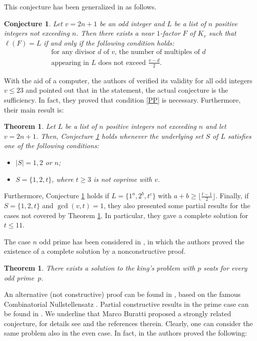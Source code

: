 \documentclass{amsart}
\newtheorem{thm}[defi]{Theorem}
\newtheorem{conj}{Conjecture}
\theoremstyle{definition}
\numberwithin{equation}{section}
\begin{document}
This conjecture has been generalized  in \cite{PP} as follows.
\begin{conj}\label{MPP}
Let $v=2n+1$ be an odd integer and  $L$ be a list of $n$ positive integers not
exceeding $n$.
Then there exists a near $1$-factor $F$ of $K_v$ such that $\ell(F)=L$ if and only if the following condition holds:
\begin{equation}\label{PP}
\left. \begin{array}{c}
\textrm{for any divisor $d$ of $v$, the number of multiples of $d$} \\
\textrm{appearing in $L$ does not exceed $\frac{v-d}{2}$.}
\end{array}\right.
\end{equation}
\end{conj}
With the aid of a computer, the authors of \cite{PP} verified its validity for all odd integers $v\leq 23$ and
pointed out that in the statement, the actual conjecture is the sufficiency. In
fact, they proved that condition \eqref{PP} is necessary. Furthermore, their main result is:

\begin{thm} \label{thm:MPP}
Let $L$ be a list of $n$ positive integers not exceeding $n$ and let $v = 2n + 1$.
Then, Conjecture \ref{MPP} holds whenever the underlying set $S$ of $L$ satisfies one of the following
conditions:
\begin{itemize}
\item[(1)] $|S|=1, 2$ or $n$;
\item[(2)] $S=\{1, 2, t\}$, where $t \geq 3$ is not coprime with $v$.
\end{itemize}
\end{thm}
Furthermore, Conjecture \ref{MPP} holds if $L=\{1^a, 2^b, t^c\}$ with $a + b \geq \lfloor\frac{t-1}{2}\rfloor$.
Finally, if $S=\{1, 2, t\}$ and $\gcd(v, t)= 1$, they also presented some partial results for the cases
not covered by Theorem \ref{thm:MPP}. In particular, they gave a complete solution for $t \leq 11$.


The case $n$ odd prime has been considered in \cite{PM}, in which the authors proved the existence of
a complete solution by a nonconstructive proof.

\begin{thm}
There exists a solution to the king's problem with $p$ seats for every odd prime~$p$.
\end{thm}

An alternative (not constructive) proof can be found in \cite{KP}, based on the famous Combinatorial Nullstellensatz \cite{A}.
Partial constructive results in the prime case can be found in \cite{R}.
We underline that Marco Buratti \cite{BM} proposed a strongly related conjecture, for details see \cite{OPPS} and the references therein.
Clearly, one can consider the same problem also in the even case.
In fact, in \cite{KSC} the authors proved  the following:
\end{document}
